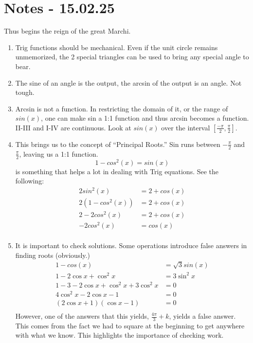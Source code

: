 \documentclass[11pt]{article}
\begin{document}
\section{Notes - 15.02.25}
Thus begins the reign of the great Marchi.
\begin{enumerate}
	\item Trig functions should be mechanical.  Even if the unit circle remains unmemorized, the 2 special triangles can be used to bring any special angle to bear.
	\item The sine of an angle is the output, the arcsin of the output is an angle.  Not tough.
	\item Arcsin is not a function.  In restricting the domain of it, or the range of $sin(x)$, one can make sin a 1:1 function and thus arcsin becomes a function.  II-III and I-IV are continuous.  Look at $sin(x)$ over the interval $\left[ \frac{-\pi}{2}, \frac{\pi}{2}\right]$.
	\item This brings us to the concept of ``Principal Roots.'' Sin runs between $-\frac{\pi}{2}$ and $\frac{\pi}{2}$, leaving us a 1:1 function. 
	$$ 1 - cos^2(x) = sin(x) $$ is something that helps a lot in dealing with Trig equations.  See the following:
	\begin{align*}
		2sin^2(x) &= 2 + cos(x) \\
		2\left(1 - cos^2(x)\right) &= 2 + cos(x) \\
		2 - 2cos^2(x) &= 2 + cos(x) \\
		-2cos^2(x) &= cos(x) \\ 
	\end{align*}
\item It is important to check solutions.  Some operations introduce false answers in finding roots (obviously.)
	\begin{align*}
		1-cos(x) &= \sqrt{3} sin(x) \\
		1 - 2\cos{x}+\cos^2x &= 3\sin^2x \\ 
		1 - 3 - 2\cos{x} + \cos^2x + 3\cos^2x &= 0 \\
		4\cos^2x - 2\cos x -1 &= 0 \\
		(2\cos x + 1)(\cos x -1) &= 0 \\
	\end{align*}
	However, one of the answers that this yields, $\frac{4\pi}{3}+k$, yields a false answer.  This comes from the fact we had to square at the beginning to get anywhere with what we know.  This highlights the importance of checking work.
\end{enumerate}
\end{document}
